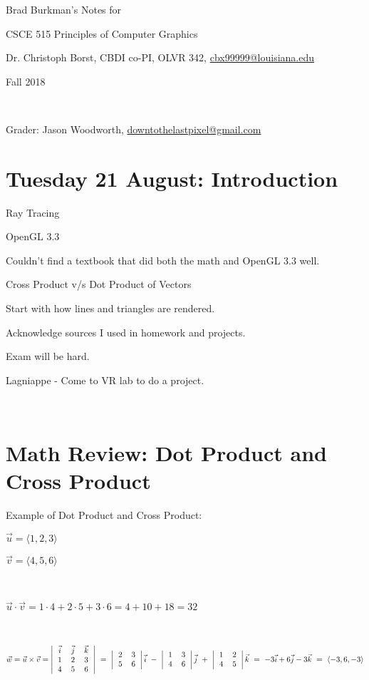 \documentclass[12pt]{article}
\begin{document}
\setlength{\parindent}{0pt}
\begin{spacing}{1.2}

%
%

Brad Burkman's Notes for

\qquad CSCE 515 Principles of Computer Graphics

\qquad Dr. Christoph Borst, CBDI co-PI, 
OLVR 342, 
\url{cbx99999@louisiana.edu}

\qquad Fall 2018

\

Grader:  Jason Woodworth, \url{downtothelastpixel@gmail.com}

\tableofcontents


\section{Tuesday 21 August:  Introduction}

Ray Tracing

OpenGL 3.3

\qquad Couldn't find a textbook that did both the math and OpenGL 3.3 well.  

Cross Product v/s Dot Product of Vectors

Start with how lines and triangles are rendered.  

Acknowledge sources I used in homework and projects.  

Exam will be hard.  

Lagniappe - Come to VR lab to do a project.  

\

\section{Math Review:  Dot Product and Cross Product}

Example of Dot Product and Cross Product:

$\vec{u} = \langle 1,2,3 \rangle$

$\vec{v} = \langle 4,5,6 \rangle$

\

$\vec{u} \cdot \vec{v} = 1 \cdot 4 + 2 \cdot 5 + 3 \cdot 6 = 4 + 10 + 18 = 32$

\

$\displaystyle \vec{w} = \vec{u} \times \vec{v} = 
	\left|
	\begin{tabular}{*3{>{$}c<{$}}}
		\vec{i} & \vec{j} & \vec{k} \cr
		1 & 2 & 3 \cr
		4 & 5 & 6 \cr
	\end{tabular}
	\right|
\ = \
	\left|
	\begin{tabular}{cc}
		2 & 3 \cr
		5 & 6 \cr
	\end{tabular}
	\right|
	\vec{i}
\ - \	
	\left|
	\begin{tabular}{cc}
		1 & 3 \cr
		4 & 6 \cr
	\end{tabular}
	\right|
	\vec{j}
\ + \ 
	\left|
	\begin{tabular}{cc}
		1 & 2 \cr
		4 & 5 \cr
	\end{tabular}
	\right|
	\vec{k}
\ = \
	-3\vec{i} + 6 \vec{j} - 3 \vec{k}
\ = \
	\langle -3,6,-3 \rangle
$


\end{spacing}
\end{document}
